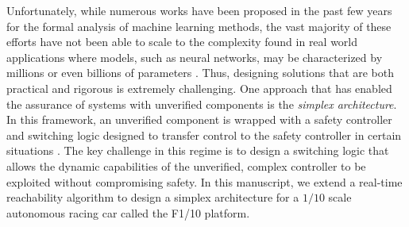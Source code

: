 \documentclass[manuscript,screen,review]{acmart}
\newcommand{\diego}[1]{\textcolor{purple}{\textbf{\underline{DM:}} #1}}
\begin{document}



Unfortunately, while numerous works have been proposed in the past few years for the formal analysis of machine learning methods, the vast majority of these efforts have not been able to scale to the complexity found in real world applications where models, such as neural networks, may be characterized by millions or even billions of parameters \cite{SimonyanVeryDeep}. Thus, designing solutions that are both practical and rigorous is extremely challenging. One approach that has enabled the assurance of systems with unverified components is the \textit{simplex architecture}. In this framework, an unverified component is wrapped with a safety controller and switching logic designed to transfer control to the safety controller in certain situations \cite{Bak2014}. The key challenge in this regime is to design a switching logic that allows the dynamic capabilities of the unverified, complex controller to be exploited without compromising safety. In this manuscript, we extend a real-time reachability algorithm \cite{Bak2014,Johnson2016} to design a simplex architecture for a $1/10$ scale autonomous racing car called the F1/10 platform. %
\end{document}

